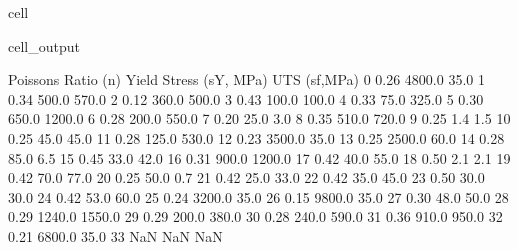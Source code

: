 \documentclass[letterpaper,10pt,english]{jupyterBook}
\begin{document}
{{\begin{sphinxuseclass}{cell}
\begin{sphinxVerbatimOutput}
\begin{sphinxuseclass}{cell_output}
\begin{sphinxVerbatim}[commandchars=\\\{\}]
    Poisson\PYGZsq{}s Ratio (n)  Yield Stress (sY, MPa)  UTS (sf,MPa)  \PYGZbs{}
0                  0.26                  4800.0          35.0   
1                  0.34                   500.0         570.0   
2                  0.12                   360.0         500.0   
3                  0.43                   100.0         100.0   
4                  0.33                    75.0         325.0   
5                  0.30                   650.0        1200.0   
6                  0.28                   200.0         550.0   
7                  0.20                    25.0           3.0   
8                  0.35                   510.0         720.0   
9                  0.25                     1.4           1.5   
10                 0.25                    45.0          45.0   
11                 0.28                   125.0         530.0   
12                 0.23                  3500.0          35.0   
13                 0.25                  2500.0          60.0   
14                 0.28                    85.0           6.5   
15                 0.45                    33.0          42.0   
16                 0.31                   900.0        1200.0   
17                 0.42                    40.0          55.0   
18                 0.50                     2.1           2.1   
19                 0.42                    70.0          77.0   
20                 0.25                    50.0           0.7   
21                 0.42                    25.0          33.0   
22                 0.42                    35.0          45.0   
23                 0.50                    30.0          30.0   
24                 0.42                    53.0          60.0   
25                 0.24                  3200.0          35.0   
26                 0.15                  9800.0          35.0   
27                 0.30                    48.0          50.0   
28                 0.29                  1240.0        1550.0   
29                 0.29                   200.0         380.0   
30                 0.28                   240.0         590.0   
31                 0.36                   910.0         950.0   
32                 0.21                  6800.0          35.0   
33                  NaN                     NaN           NaN   


\end{sphinxVerbatim}
\end{sphinxuseclass}
\end{sphinxVerbatimOutput}
\end{sphinxuseclass}}}
\end{document}
